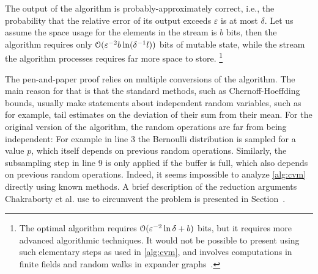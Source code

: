 The output of the algorithm is probably-approximately correct, i.e., the probability that the relative error of its output exceeds $\varepsilon$ is at most $\delta$.
Let us assume the space usage for the elements in the stream is $b$ bits, then the algorithm requires only $\operatorname{\mathcal O}(\varepsilon^{-2} b \ln(\delta^{-1} l))$ bits of mutable state, while the stream the algorithm processes requires far more space to store.%
\footnote{The optimal algorithm requires $\operatorname{\mathcal O}( \varepsilon^{-2} \ln \delta + b)$ bits, but it requires more advanced algorithmic techniques. It would not be possible to present using such elementary steps as used in \cref{alg:cvm}, and involves computations in finite fields and random walks in expander graphs~\cite{blasiok2020, karayel2023}.}

The pen-and-paper proof relies on multiple conversions of the algorithm.
The main reason for that is that the standard methods, such as Chernoff-Hoeffding bounds, usually make statements about independent random variables, such as for example, tail estimates on the deviation of their sum from their mean.
For the original version of the algorithm, the random operations are far from being independent:
For example in line 3 the Bernoulli distribution is sampled for a value $p$, which itself depends on previous random operations.
Similarly, the subsampling step in line 9 is only applied if the buffer is full, which also depends on previous random operations.
Indeed, it seems impossible to analyze \cref{alg:cvm} directly using known methods.
A brief description of the reduction arguments Chakraborty et al. use to circumvent the problem is presented in Section~. %

